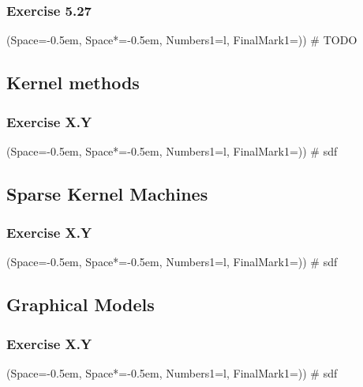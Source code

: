 \documentclass[12pt, a4paper]{article}
\newcommand{\listSpace}{-0.5em}%
\begin{document}
\subsubsection*{Exercise 5.27}
\begin{easylist}[enumerate]
	\ListProperties(Space=\listSpace, Space*=\listSpace, Numbers1=l, FinalMark1={)})
	# TODO
\end{easylist}

\subsection{Kernel methods}
\subsubsection*{Exercise X.Y}
\begin{easylist}[enumerate]
	\ListProperties(Space=\listSpace, Space*=\listSpace, Numbers1=l, FinalMark1={)})
	# sdf
\end{easylist}

\subsection{Sparse Kernel Machines}
\subsubsection*{Exercise X.Y}
\begin{easylist}[enumerate]
	\ListProperties(Space=\listSpace, Space*=\listSpace, Numbers1=l, FinalMark1={)})
	# sdf
\end{easylist}

\subsection{Graphical Models}
\subsubsection*{Exercise X.Y}
\begin{easylist}[enumerate]
	\ListProperties(Space=\listSpace, Space*=\listSpace, Numbers1=l, FinalMark1={)})
	# sdf
\end{easylist}

\end{document}
